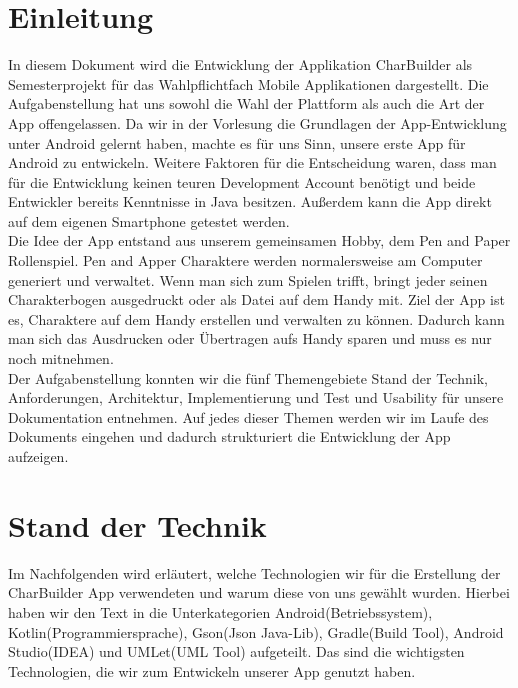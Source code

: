 \newpage
\section{Einleitung}
In diesem Dokument wird die Entwicklung der Applikation CharBuilder als Semesterprojekt für das Wahlpflichtfach Mobile Applikationen dargestellt. Die Aufgabenstellung hat uns sowohl die Wahl der Plattform als auch die Art der App offengelassen. Da wir in der Vorlesung die Grundlagen der App-Entwicklung unter Android gelernt haben, machte es für uns Sinn, unsere erste App für Android zu entwickeln. Weitere Faktoren für die Entscheidung waren, dass man für die Entwicklung keinen teuren Development Account benötigt und beide Entwickler bereits Kenntnisse in Java besitzen. Außerdem kann die App direkt auf dem eigenen Smartphone getestet werden.\\

Die Idee der App entstand aus unserem gemeinsamen Hobby, dem Pen and Paper Rollenspiel. Pen and Apper Charaktere werden normalersweise am Computer generiert und verwaltet. Wenn man sich zum Spielen trifft, bringt jeder seinen Charakterbogen ausgedruckt oder als Datei auf dem Handy mit. Ziel der App ist es, Charaktere auf dem Handy erstellen und verwalten zu können. Dadurch kann man sich das Ausdrucken oder Übertragen aufs Handy sparen und muss es nur noch mitnehmen.\\

Der Aufgabenstellung konnten wir die fünf Themengebiete Stand der Technik, Anforderungen, Architektur, Implementierung und Test und Usability für unsere Dokumentation entnehmen. Auf jedes dieser Themen werden wir im Laufe des Dokuments eingehen und dadurch strukturiert die Entwicklung der App aufzeigen.

\newpage
\section{Stand der Technik}
Im Nachfolgenden wird erläutert, welche Technologien wir für die Erstellung der CharBuilder App verwendeten und warum diese von uns gewählt wurden. Hierbei haben wir den Text in die Unterkategorien Android(Betriebssystem), Kotlin(Programmiersprache), Gson(Json Java-Lib), Gradle(Build Tool), Android Studio(IDEA) und UMLet(UML Tool) aufgeteilt. Das sind die wichtigsten Technologien, die wir zum Entwickeln unserer App genutzt haben.

